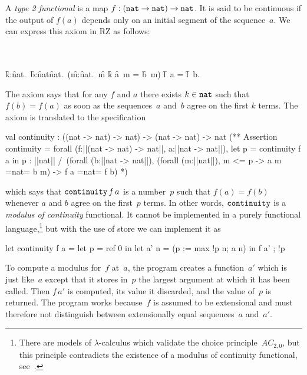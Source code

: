 A \emph{type 2 functional} is a map $f : (\mathtt{nat} \to \mathtt{nat})
\to \mathtt{nat}$. It is said to be continuous if the output of $f(a)$
depends only on an initial segment of the sequence~$a$. We can express
this axiom in RZ as follows:
%
\begin{showInput}
\\
\\
\qquad\qquad
    \exists \f{k}{:}\f{nat}.\ 
    \forall \f{b}{:}\f{nat}{\to}\f{nat}.\
    (\forall \f{m}{:}\f{nat}.\ \f{m} \leq \f{k} \Rightarrow \f{a\ m} = \f{b\ m})
     \Rightarrow \f{f\ a} = \f{f\ b}.
\end{showInput}
%
The axiom says that for any $f$ and $a$ there exists $k \in
\mathtt{nat}$ such that $f(b) = f(a)$ as soon as the sequences~$a$
and~$b$ agree on the first $k$ terms. The axiom is translated to the
specification
%
\begin{source}
val continuity : ((nat -> nat) -> nat) -> (nat -> nat) -> nat
(**  Assertion continuity =
forall (f:||(nat -> nat) -> nat||, a:||nat -> nat||),
  let p = continuity f a in p : ||nat|| /\
  (forall (b:||nat -> nat||),
     (forall (m:||nat||),  m <= p -> a m =nat= b m) -> f a =nat= f b)
*)
\end{source}
%
which says that $\mathtt{continuity}\,f\,a$ is a number~$p$ such that
$f(a) = f(b)$ whenever $a$ and $b$ agree on the first~$p$ terms. In
other words, $\mathtt{continuity}$ is a \emph{modulus of continuity}
functional. It cannot be implemented in a purely functional
language,\footnote{There are models of $\lambda$-calculus which validate
  the choice principle~$AC_{2,0}$, but this principle contradicts the
  existence of a modulus of continuity functional,
  see~\cite[9.6.10]{Troelstra:van-Dalen:88:2}.} but with the use of
store we can implement it as
%
\begin{source}
let continuity f a =
  let p = ref 0 in
  let a' n = (p := max !p n; a n) in
    f a' ; !p
\end{source}
%
To compute a modulus for~$f$ at~$a$, the program creates a
function~$a'$ which is just like~$a$ except that it stores in~$p$ the
largest argument at which it has been called. Then $f\,a'$ is
computed, its value it discarded, and the value of~$p$ is returned.
The program works because~$f$ is assumed to be extensional and must
therefore not distinguish between extensionally equal sequences~$a$
and~$a'$.



